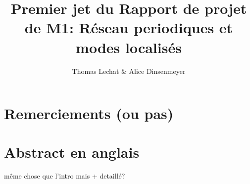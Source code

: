 \documentclass[a4paper]{report}
\title{Premier jet du Rapport de projet de M1: Réseau periodiques et modes localisés }
\author{Thomas Lechat \& Alice Dinsenmeyer}
\begin{document}
\maketitle
\tableofcontents

\chapter{Remerciements (ou pas)}

\chapter{Abstract en anglais}
même chose que l'intro mais + detaillé?






\end{document}
